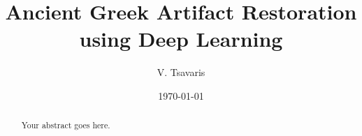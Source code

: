 \documentclass{report}
\begin{document}
\title{Ancient Greek Artifact Restoration using Deep Learning}
\author{V. Tsavaris}
\date{\today}
\maketitle

\begin{abstract}
    Your abstract goes here.
\end{abstract}

\tableofcontents


% 

\printbibliography
\end{document}
